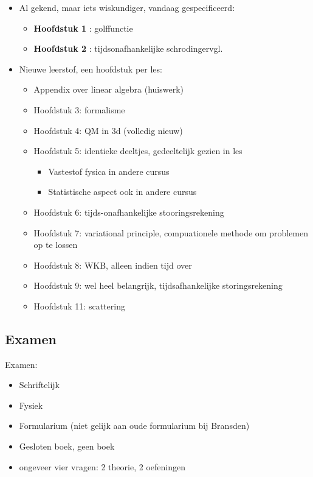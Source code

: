 \documentclass[dutch,course]{lecture}
\begin{document}
\begin{itemize}

\item
  Al gekend, maar iets wiskundiger, vandaag gespecificeerd:
  \begin{itemize}
\item
  \textbf{Hoofdstuk 1} : golffunctie
\item
  \textbf{Hoofdstuk 2} : tijdsonafhankelijke schrodingervgl.
  \end{itemize}
\item
  Nieuwe leerstof, een hoofdstuk per les:
  \begin{itemize}
\item
  Appendix over linear algebra (huiswerk)
\item
  Hoofdstuk 3: formalisme
\item
  Hoofdstuk 4: QM in 3d (volledig nieuw)
\item
  Hoofdstuk 5: identieke deeltjes, gedeeltelijk gezien in les

  \begin{itemize}
  
  \item
    Vastestof fysica in andere cursus
  \item
    Statistische aspect ook in andere cursus
  \end{itemize}
\item
  Hoofdstuk 6: tijds-onafhankelijke stooringsrekening
\item
  Hoofdstuk 7: variational principle, compuationele methode om problemen
  op te lossen
\item
  Hoofdstuk 8: WKB, alleen indien tijd over
\item
  Hoofdstuk 9: wel heel belangrijk, tijdsafhankelijke storingsrekening
\item
  Hoofdstuk 11: scattering
  \end{itemize}
\end{itemize}


\subsection*{Examen}

Examen:

\begin{itemize}

\item
  Schriftelijk
\item
  Fysiek
\item
  Formularium (niet gelijk aan oude formularium bij Bransden)
\item
  Gesloten boek, geen boek
\item ongeveer vier vragen: 2 theorie, 2 oefeningen
\end{itemize}
\end{document}
